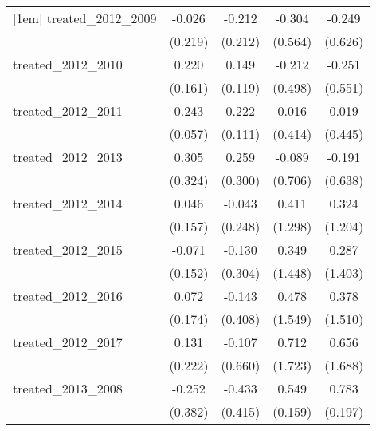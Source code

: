 {\begin{tabular}{l*{4}{c}}
[1em]
treated\_2012\_2009&      -0.026         &      -0.212         &      -0.304         &      -0.249         \\
            &     (0.219)         &     (0.212)         &     (0.564)         &     (0.626)         \\
[1em]
treated\_2012\_2010&       0.220         &       0.149         &      -0.212         &      -0.251         \\
            &     (0.161)         &     (0.119)         &     (0.498)         &     (0.551)         \\
[1em]
treated\_2012\_2011&       0.243\sym{***}&       0.222\sym{*}  &       0.016         &       0.019         \\
            &     (0.057)         &     (0.111)         &     (0.414)         &     (0.445)         \\
[1em]
treated\_2012\_2013&       0.305         &       0.259         &      -0.089         &      -0.191         \\
            &     (0.324)         &     (0.300)         &     (0.706)         &     (0.638)         \\
[1em]
treated\_2012\_2014&       0.046         &      -0.043         &       0.411         &       0.324         \\
            &     (0.157)         &     (0.248)         &     (1.298)         &     (1.204)         \\
[1em]
treated\_2012\_2015&      -0.071         &      -0.130         &       0.349         &       0.287         \\
            &     (0.152)         &     (0.304)         &     (1.448)         &     (1.403)         \\
[1em]
treated\_2012\_2016&       0.072         &      -0.143         &       0.478         &       0.378         \\
            &     (0.174)         &     (0.408)         &     (1.549)         &     (1.510)         \\
[1em]
treated\_2012\_2017&       0.131         &      -0.107         &       0.712         &       0.656         \\
            &     (0.222)         &     (0.660)         &     (1.723)         &     (1.688)         \\
[1em]
treated\_2013\_2008&      -0.252         &      -0.433         &       0.549\sym{***}&       0.783\sym{***}\\
            &     (0.382)         &     (0.415)         &     (0.159)         &     (0.197)         \\

\end{tabular}}
